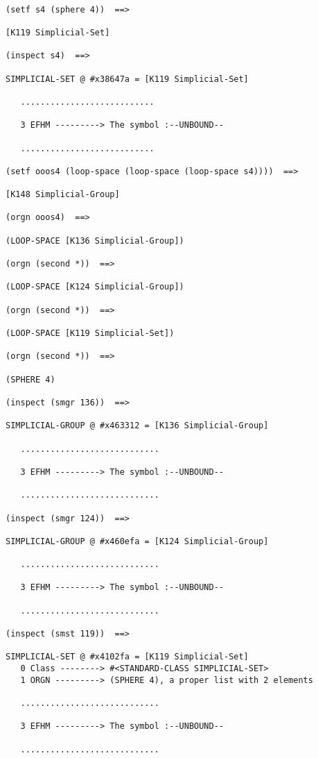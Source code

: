 {\footnotesize\begin{verbatim}

(setf s4 (sphere 4))  ==>

[K119 Simplicial-Set]

(inspect s4)  ==>

SIMPLICIAL-SET @ #x38647a = [K119 Simplicial-Set]

   ...........................

   3 EFHM ---------> The symbol :--UNBOUND--

   ...........................

(setf ooos4 (loop-space (loop-space (loop-space s4))))  ==>

[K148 Simplicial-Group]

(orgn ooos4)  ==>

(LOOP-SPACE [K136 Simplicial-Group])

(orgn (second *))  ==>

(LOOP-SPACE [K124 Simplicial-Group])

(orgn (second *))  ==>

(LOOP-SPACE [K119 Simplicial-Set])

(orgn (second *))  ==>

(SPHERE 4)

(inspect (smgr 136))  ==>

SIMPLICIAL-GROUP @ #x463312 = [K136 Simplicial-Group]

   ............................

   3 EFHM ---------> The symbol :--UNBOUND--

   ............................

(inspect (smgr 124))  ==>

SIMPLICIAL-GROUP @ #x460efa = [K124 Simplicial-Group]

   ............................

   3 EFHM ---------> The symbol :--UNBOUND--

   ............................

(inspect (smst 119))  ==>

SIMPLICIAL-SET @ #x4102fa = [K119 Simplicial-Set]
   0 Class --------> #<STANDARD-CLASS SIMPLICIAL-SET>
   1 ORGN ---------> (SPHERE 4), a proper list with 2 elements

   ............................

   3 EFHM ---------> The symbol :--UNBOUND--

   ............................


\end{verbatim}}
